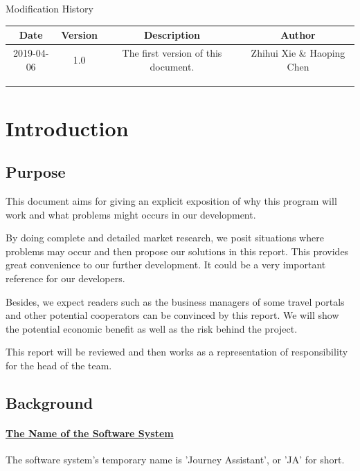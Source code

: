 \documentclass[10pt]{article}
\begin{document}
\newpage

\begin{center}
    {\LARGE Modification History}
    
    \begin{tabular}{|c|c|c|c|} 
        \hline 
        Date&Version&Description&Author\\
        \hline  
        2019-04-06&1.0&The first version of this document.&Zhihui Xie \& Haoping Chen\\
		\hline 
		 & & & \\
		\hline
		& & & \\
		\hline
		& & & \\
		\hline
    \end{tabular}    
\end{center}

\newpage

\tableofcontents
\newpage


\section{Introduction}
\subsection{Purpose}
This document aims for giving an explicit exposition of why this program will work and what problems might occurs in our development. 

By doing complete and detailed market research, we posit situations where problems may occur and then propose our solutions in this report. This provides great convenience to our further development. It could be a very important reference for our developers. 

Besides, we expect readers such as the business managers of some travel portals and other potential cooperators can be convinced by this report. We will show the potential economic benefit as well as the risk behind the project.

This report will be reviewed and then works as a representation of responsibility for the head of the team.
\subsection{Background}
\paragraph{\underline{The Name of the Software System}}
The software system's temporary name is 'Journey Assistant', or 'JA' for short. 
\end{document}
